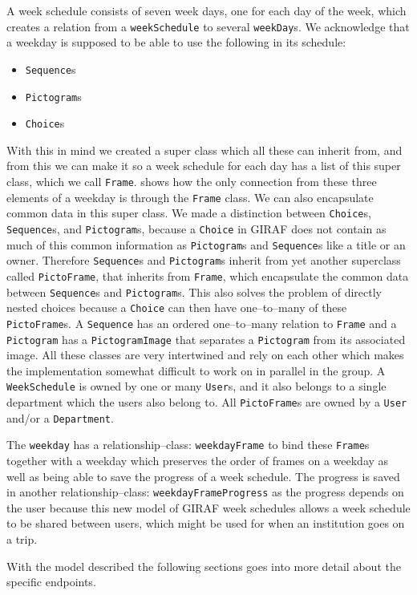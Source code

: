 A week schedule consists of seven week days, one for each day of the week, which creates a relation from a \texttt{weekSchedule} to several \texttt{weekDay}s.
We acknowledge that a weekday is supposed to be able to use the following in its schedule: 

\begin{itemize}
	\item \texttt{Sequence}s
	\item \texttt{Pictogram}s
	\item \texttt{Choice}s
\end{itemize}

With this in mind we created a super class which all these can inherit from, and from this we can make it so a week schedule for each day has a list of this super class, which we call \texttt{Frame}.
 shows how the only connection from these three elements of a weekday is through the \texttt{Frame} class.
We can also encapsulate common data in this super class.
We made a distinction between \texttt{Choice}s, \texttt{Sequence}s, and \texttt{Pictogram}s, because a \texttt{Choice} in GIRAF does not contain as much of this common information as \texttt{Pictogram}s and \texttt{Sequence}s like a title or an owner.
Therefore \texttt{Sequence}s and \texttt{Pictogram}s inherit from yet another superclass called \texttt{PictoFrame}, that inherits from \texttt{Frame}, which encapsulate the common data between \texttt{Sequence}s and \texttt{Pictogram}s.
This also solves the problem of directly nested choices because a \texttt{Choice} can then have one--to--many of these \texttt{PictoFrame}s.
A \texttt{Sequence} has an ordered one--to--many relation to \texttt{Frame} and a \texttt{Pictogram} has a \texttt{PictogramImage} that separates a \texttt{Pictogram} from its associated image.
All these classes are very intertwined and rely on each other which makes the implementation somewhat difficult to work on in parallel in the group.
A \texttt{WeekSchedule} is owned by one or many \texttt{User}s, and it also belongs to a single department which the users also belong to.
All \texttt{PictoFrame}s are owned by a \texttt{User} and/or a \texttt{Department}.

The \texttt{weekday} has a relationship--class: \texttt{weekdayFrame} to bind these \texttt{Frame}s together with a weekday which preserves the order of frames on a weekday as well as being able to save the progress of a week schedule.
The progress is saved in another relationship--class: \texttt{weekdayFrameProgress} as the progress depends on the user because this new model of GIRAF week schedules allows a week schedule to be shared between users, which might be used for when an institution goes on a trip.

With the model described the following sections goes into more detail about the specific endpoints.
